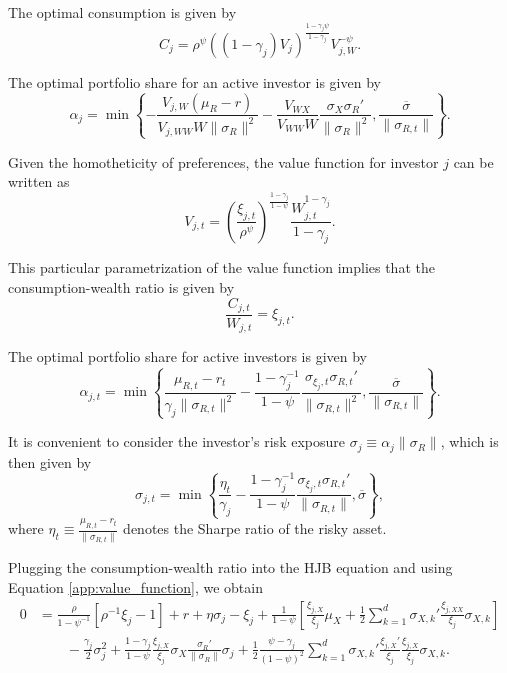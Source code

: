 The optimal consumption is given by
\begin{equation}
 C_j = \rho^\psi ((1-\gamma_j) V_j)^{\frac{1-\gamma_j\psi }{1-\gamma_j}}V_{j,W}^{-\psi}.
\end{equation}

The optimal portfolio share for an active investor is given by
\begin{equation}
\alpha_j = \min \left\{ -\frac{V_{j,W} (\mu_R-r)}{V_{j,WW} W \|\sigma_R\|^2}   - \frac{V_{WX}}{V_{WW} W} \frac{\sigma_X \sigma_R'}{\|\sigma_R\|^2}, \frac{\overline{\sigma}}{\|\sigma_{R,t}\|} \right\}.
\end{equation}

Given the homotheticity of preferences, the value function for investor $j$ can be written as
\begin{equation}\label{app:value_function}
    V_{j,t} = \left(\frac{\xi_{j,t}}{\rho^\psi}\right)^{\frac{1-\gamma_j}{1-\psi}} \frac{W_{j,t}^{1-\gamma_j}}{1-\gamma_j}.
\end{equation}

This particular parametrization of the value function implies that the consumption-wealth ratio is given by
\begin{equation}
    \frac{C_{j,t}}{W_{j,t}} = \xi_{j,t}.
\end{equation}

The optimal portfolio share for active investors is given by
\begin{equation}
    \alpha_{j,t}
    = \min \left\{ \frac{\mu_{R,t}-r_t}{\gamma_j \|\sigma_{R,t}\|^2}  - \frac{1-\gamma_j^{-1}}{1-\psi} \frac{\sigma_{\xi_j,t} \sigma_{R,t}'}{\|\sigma_{R,t}\|^2}, \frac{\overline{\sigma}}{\|\sigma_{R,t}\|} \right\}.
\end{equation}

It is convenient to consider the investor's risk exposure $\sigma_{j} \equiv  \alpha_j \|\sigma_R\|$, which is then given by
\begin{equation}
    \sigma_{j,t} = \min \left\{ \frac{\eta_t}{\gamma_j}  - \frac{1-\gamma_j^{-1}}{1-\psi} \frac{\sigma_{\xi_j,t} \sigma_{R,t}'}{\|\sigma_{R,t}\|}, \overline{\sigma} \right\},
\end{equation}
where $\eta_t \equiv \frac{\mu_{R,t} - r_t}{\|\sigma_{R,t}\|}$ denotes the Sharpe ratio of the risky asset.

Plugging the consumption-wealth ratio into the HJB equation and using Equation \eqref{app:value_function}, we obtain
\begin{align}
    0 &=  \frac{\rho   }{1-\psi^{-1}} \left[  \rho^{-1} \xi_j-1 \right] + r  + \eta \sigma_j   - \xi_j + \frac{1}{1-\psi} \left[ \frac{\xi_{j,X}}{\xi_j} \mu_X + \frac{1}{2} \sum_{k=1}^d \sigma_{X,k}' \frac{\xi_{j,XX}}{\xi_j} \sigma_{X,k}\right]\nonumber\\
    &\qquad - \frac{\gamma_j}{2} \sigma_j^2  + \frac{1-\gamma_j}{1-\psi} \frac{\xi_{j,X}}{\xi_j} \sigma_X \frac{\sigma_R'}{\|\sigma_R\|} \sigma_j    + \frac{1}{2} \frac{\psi-\gamma_j}{(1-\psi)^2} \sum_{k=1}^d \sigma_{X,k}' \frac{\xi_{j,X}'}{\xi_j} \frac{\xi_{j,X}}{\xi_j} \sigma_{X,k}.
\end{align}

